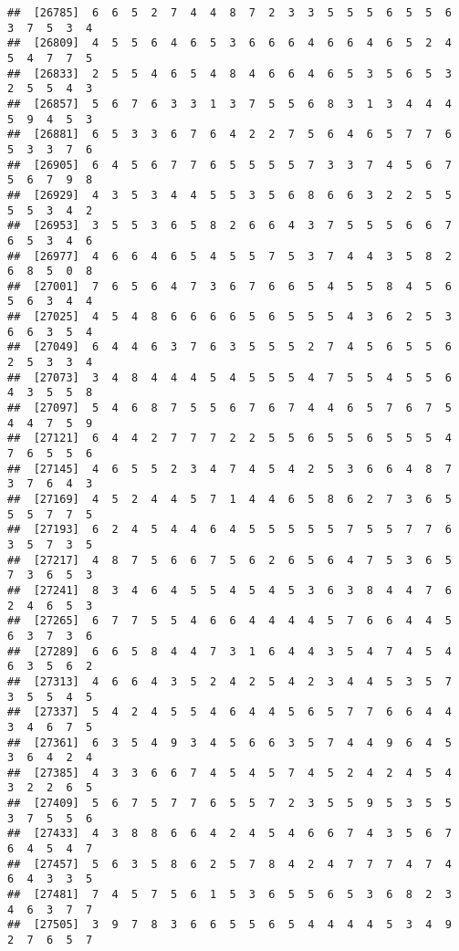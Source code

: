 \documentclass[
]{book}
\begin{document}
\begin{verbatim}
##  [26785]  6  6  5  2  7  4  4  8  7  2  3  3  5  5  5  6  5  5  6  3  7  5  3  4
##  [26809]  4  5  5  6  4  6  5  3  6  6  6  4  6  6  4  6  5  2  4  5  4  7  7  5
##  [26833]  2  5  5  4  6  5  4  8  4  6  6  4  6  5  3  5  6  5  3  2  5  5  4  3
##  [26857]  5  6  7  6  3  3  1  3  7  5  5  6  8  3  1  3  4  4  4  5  9  4  5  3
##  [26881]  6  5  3  3  6  7  6  4  2  2  7  5  6  4  6  5  7  7  6  5  3  3  7  6
##  [26905]  6  4  5  6  7  7  6  5  5  5  5  7  3  3  7  4  5  6  7  5  6  7  9  8
##  [26929]  4  3  5  3  4  4  5  5  3  5  6  8  6  6  3  2  2  5  5  5  5  3  4  2
##  [26953]  3  5  5  3  6  5  8  2  6  6  4  3  7  5  5  5  6  6  7  6  5  3  4  6
##  [26977]  4  6  6  4  6  5  4  5  5  7  5  3  7  4  4  3  5  8  2  6  8  5  0  8
##  [27001]  7  6  5  6  4  7  3  6  7  6  6  5  4  5  5  8  4  5  6  5  6  3  4  4
##  [27025]  4  5  4  8  6  6  6  6  5  6  5  5  5  4  3  6  2  5  3  6  6  3  5  4
##  [27049]  6  4  4  6  3  7  6  3  5  5  5  2  7  4  5  6  5  5  6  2  5  3  3  4
##  [27073]  3  4  8  4  4  4  5  4  5  5  5  4  7  5  5  4  5  5  6  4  3  5  5  8
##  [27097]  5  4  6  8  7  5  5  6  7  6  7  4  4  6  5  7  6  7  5  4  4  7  5  9
##  [27121]  6  4  4  2  7  7  7  2  2  5  5  6  5  5  6  5  5  5  4  7  6  5  5  6
##  [27145]  4  6  5  5  2  3  4  7  4  5  4  2  5  3  6  6  4  8  7  3  7  6  4  3
##  [27169]  4  5  2  4  4  5  7  1  4  4  6  5  8  6  2  7  3  6  5  5  5  7  7  5
##  [27193]  6  2  4  5  4  4  6  4  5  5  5  5  5  7  5  5  7  7  6  3  5  7  3  5
##  [27217]  4  8  7  5  6  6  7  5  6  2  6  5  6  4  7  5  3  6  5  7  3  6  5  3
##  [27241]  8  3  4  6  4  5  5  4  5  4  5  3  6  3  8  4  4  7  6  2  4  6  5  3
##  [27265]  6  7  7  5  5  4  6  6  4  4  4  4  5  7  6  6  4  4  5  6  3  7  3  6
##  [27289]  6  6  5  8  4  4  7  3  1  6  4  4  3  5  4  7  4  5  4  6  3  5  6  2
##  [27313]  4  6  6  4  3  5  2  4  2  5  4  2  3  4  4  5  3  5  7  3  5  5  4  5
##  [27337]  5  4  2  4  5  5  4  6  4  4  5  6  5  7  7  6  6  4  4  3  4  6  7  5
##  [27361]  6  3  5  4  9  3  4  5  6  6  3  5  7  4  4  9  6  4  5  3  6  4  2  4
##  [27385]  4  3  3  6  6  7  4  5  4  5  7  4  5  2  4  2  4  5  4  3  2  2  6  5
##  [27409]  5  6  7  5  7  7  6  5  5  7  2  3  5  5  9  5  3  5  5  3  7  5  5  6
##  [27433]  4  3  8  8  6  6  4  2  4  5  4  6  6  7  4  3  5  6  7  6  4  5  4  7
##  [27457]  5  6  3  5  8  6  2  5  7  8  4  2  4  7  7  7  4  7  4  6  4  3  3  5
##  [27481]  7  4  5  7  5  6  1  5  3  6  5  5  6  5  3  6  8  2  3  4  6  3  7  7
##  [27505]  3  9  7  8  3  6  6  5  5  6  5  4  4  4  4  5  3  4  9  2  7  6  5  7

\end{verbatim}
\end{document}
